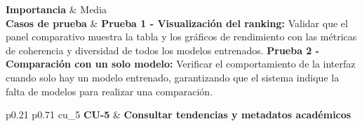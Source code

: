 {	\textbf{Importancia}          & Media                                                                                                                 \\
	\textbf{Casos de prueba}      & \textbf{Prueba 1 - Visualización del ranking:} Validar que el panel comparativo muestra la tabla y los gráficos de rendimiento con las métricas de coherencia y diversidad de todos los modelos entrenados. \newline \textbf{Prueba 2 - Comparación con un solo modelo:} Verificar el comportamiento de la interfaz cuando solo hay un modelo entrenado, garantizando que el sistema indique la falta de modelos para realizar una comparación. \\
}

{p{0.21\textwidth} p{0.71\textwidth}}
{cu_5}
{
	\textbf{CU-5}                 & \textbf{Consultar tendencias y metadatos académicos}                                                                 \\
}
